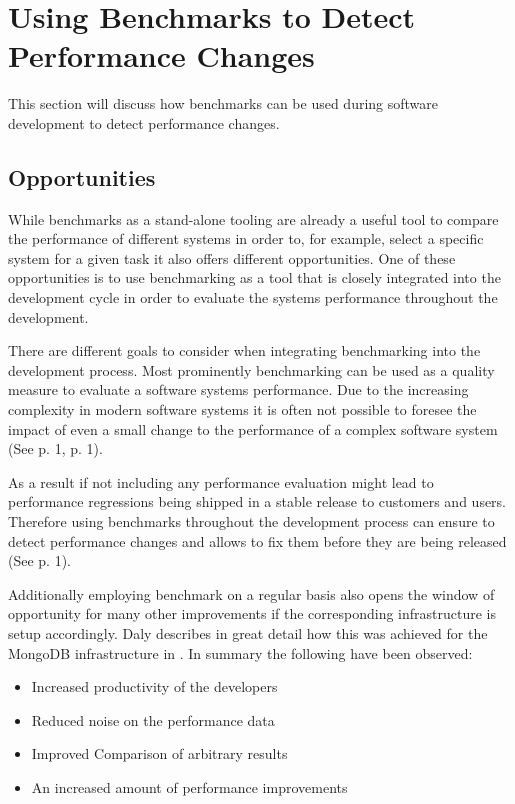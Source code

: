 \documentclass[	runningheads,
				a4paper]{llncs}
\begin{document}
\section{Using Benchmarks to Detect Performance Changes}
\label{sec:bench_perf_changes}
	This section will discuss how benchmarks can be used during software development to detect performance changes.
	
	\subsection{Opportunities}
	\label{ssec:bench_perf_oppo}
	While benchmarks as a stand-alone tooling are already a useful tool to compare the performance of different systems in order to, for example, select a specific system for a given task it also offers different opportunities. One of these opportunities is to use benchmarking as a tool that is closely integrated into the development cycle in order to evaluate the systems performance throughout the development.

	There are different goals to consider when integrating benchmarking into the development process. Most prominently benchmarking can be used as a quality measure to evaluate a software systems performance. Due to the increasing complexity in modern software systems it is often not possible to foresee the impact of even a small change to the performance of a complex software system (See \cite{grambow2019} p. 1, \cite{daly2021} p. 1). 
	
	As a result if not including any performance evaluation might lead to performance regressions being shipped in a stable release to customers and users. Therefore using benchmarks throughout the development process can ensure to detect performance changes and allows to fix them before they are being released (See \cite{daly2021} p. 1). 

	Additionally employing benchmark on a regular basis also opens the window of opportunity for many other improvements if the corresponding infrastructure is setup accordingly. Daly describes in great detail how this was achieved for the MongoDB infrastructure in \cite{daly2021}. In summary the following have been observed:
	\begin{itemize}
		\item Increased productivity of the developers
		\item Reduced noise on the performance data
		\item Improved Comparison of arbitrary results
		\item An increased amount of performance improvements
	\end{itemize}
\end{document}
